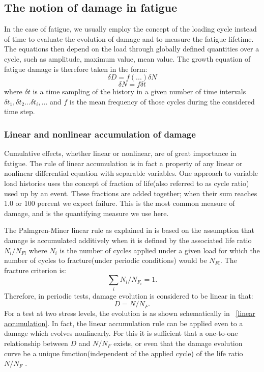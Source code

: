 \documentclass[3p,times,procedia,number]{elsarticle}
\newcommand{\figref}[1]{\figurename~\ref{#1}}
\begin{document}
\subsection{The notion of damage in fatigue}


In the case of fatigue, we usually employ the concept of the loading cycle instead of time to evaluate the evolution of damage and to measure the fatigue lifetime. The equations then depend on the load through globally defined quantities over a cycle, such as amplitude, maximum value, mean value.
The growth equation of fatigue damage is therefore taken in the form:
$$\delta D=f(...)\delta N$$
$$\delta N=f\delta t$$
where $\delta t$ is a time sampling of the history in a given number of time intervals $\delta t_1,\delta t_2 ... \delta t_i, ...$ and $f$ is the mean frequency of those cycles during the considered time step.

\subsubsection{Linear and nonlinear accumulation of damage}
Cumulative effects, whether linear or nonlinear, are of great importance in fatigue. The rule of linear accumulation is in fact a property of any linear or nonlinear differential equation with separable variables. One approach to variable load histories uses the concept of fraction of life(also referred to as cycle ratio) used up by an event. These fractions are added together; when their sum reaches 1.0 or 100 percent we expect failure. This is the most common measure of damage, and is the quantifying measure we use here. 

The Palmgren-Miner linear rule as explained in \cite{lemaitre1990mechanics} is based on the assumption that damage is accumulated additively when it is defined by the associated life ratio $N_i/N_{Fi}$ where $N_i$ is the number of cycles applied under a given load for which the number of cycles to fracture(under periodic conditions) would be $N_{Fi}$. The fracture criterion is:
$$\sum_{i}N_i/N_{F_i}=1.$$
Therefore, in periodic tests, damage evolution is considered to be linear in that:
$$D=N/N_F.$$
For a test at two stress levels, the evolution is as shown schematically in \figref{linear accumulation}. In fact, the linear accumulation rule can be applied even to a damage which evolves nonlinearly. For this it is sufficient that a one-to-one relationship between $D$ and $N/N_F$ exists, or even that the damage evolution curve be a unique function(independent of the applied cycle) of the life ratio $N/N_F$ . 
\end{document}
